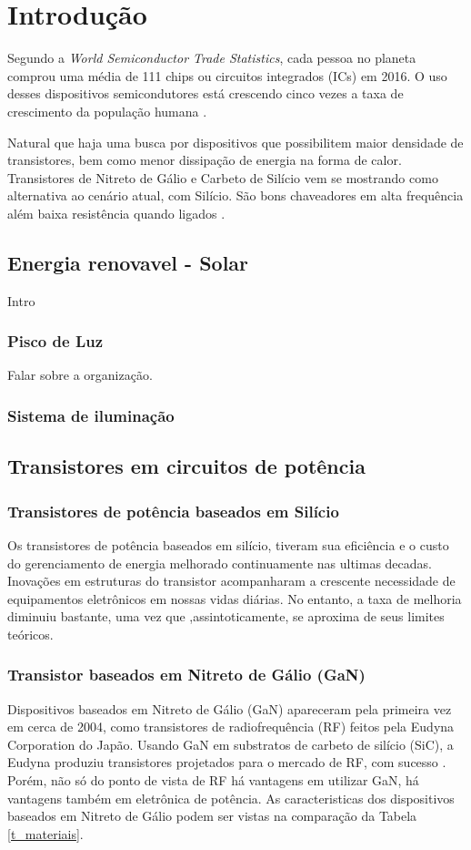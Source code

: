 \chapter{Introdu\c{c}\~ao}
Segundo a \textit{World Semiconductor Trade Statistics}, cada pessoa no planeta comprou uma média de 111 chips ou circuitos integrados (ICs) em 2016. O uso desses dispositivos semicondutores está crescendo cinco vezes a taxa de crescimento da população humana \cite{Sameer}. \par
\noindent Natural que haja uma busca por dispositivos que possibilitem maior densidade de transistores, bem como menor dissipação de energia na forma de calor. Transistores de Nitreto de Gálio e Carbeto de Silício vem se mostrando como alternativa ao cenário atual, com Silício. São bons chaveadores em alta frequência além baixa resistência quando ligados \cite{lidow_rooij_strydom_reusch_glaser_2020}. 

\section{Energia renovavel - Solar}
Intro
\subsection{Pisco de Luz}
Falar sobre a organização. 
\subsection{Sistema de iluminação}

\section{Transistores em circuitos de potência}
\subsection{Transistores de potência baseados em Silício}
Os transistores de potência baseados em silício, tiveram sua eficiência e o custo do gerenciamento de energia melhorado continuamente nas ultimas decadas. Inovações em estruturas do transistor acompanharam a crescente necessidade de equipamentos eletrônicos em nossas vidas diárias. No entanto, a taxa de melhoria diminuiu bastante, uma vez que ,assintoticamente, se aproxima de seus limites teóricos. \cite{lidow_rooij_strydom_reusch_glaser_2020}

\subsection{Transistor baseados em Nitreto de Gálio (GaN)}
Dispositivos baseados em Nitreto de Gálio (GaN) apareceram pela primeira vez em cerca de 2004, como transistores de radiofrequência (RF) feitos pela Eudyna Corporation do Japão. Usando GaN em substratos de carbeto de silício (SiC), a Eudyna produziu transistores projetados para o mercado de RF, com sucesso \cite{Alex}. Porém, não só do ponto de vista de RF há vantagens em utilizar GaN, há vantagens também em eletrônica de potência. As caracteristicas dos dispositivos baseados em Nitreto de Gálio podem ser vistas na comparação da Tabela \ref{t_materiais}.

